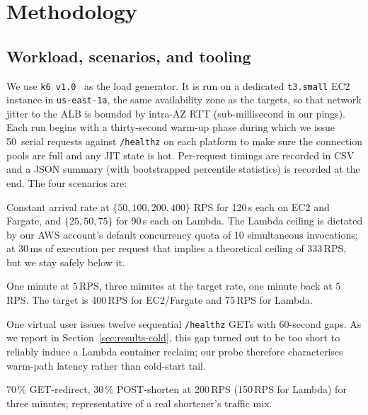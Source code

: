\section{Methodology}
\label{sec:methodology}

\subsection{Workload, scenarios, and tooling}

We use \texttt{k6 v1.0}~\cite{k6} as the load generator. It is run on
a dedicated \texttt{t3.small} EC2 instance in \texttt{us-east-1a}, the
same availability zone as the targets, so that network jitter to the
ALB is bounded by intra-AZ RTT (sub-millisecond in our pings). Each run
begins with a thirty-second warm-up phase during which we issue
50~serial requests against \texttt{/healthz} on each platform to make
sure the connection pools are full and any JIT state is hot.
Per-request timings are recorded in CSV and a JSON summary (with
bootstrapped percentile statistics) is recorded at the end. The four
scenarios are:

\begin{description}[leftmargin=1em,labelindent=0pt,itemsep=2pt]
\item[Steady-state RPS sweep.] Constant arrival rate at
      $\{50, 100, 200, 400\}$ RPS for 120\,s each on EC2 and Fargate,
      and $\{25, 50, 75\}$ for 90\,s each on Lambda. The Lambda ceiling
      is dictated by our AWS account's default concurrency quota of 10
      simultaneous invocations; at 30\,ms of execution per request that
      implies a theoretical ceiling of 333\,RPS, but we stay safely
      below it.
\item[Step-arrival burst.] One minute at 5\,RPS, three minutes at the
      target rate, one minute back at 5\,RPS. The target is 400\,RPS
      for EC2/Fargate and 75\,RPS for Lambda.
\item[Cold-start probe.] One virtual user issues twelve sequential
      \texttt{/healthz} GETs with 60-second gaps. As we report in
      Section~\ref{sec:results-cold}, this gap turned out to be too short to
      reliably induce a Lambda container reclaim; our probe therefore
      characterises warm-path latency rather than cold-start tail.
\item[Mixed read/write.] 70\,\% GET-redirect, 30\,\% POST-shorten at
      200\,RPS (150\,RPS for Lambda) for three minutes; representative
      of a real shortener's traffic mix.
\end{description}

